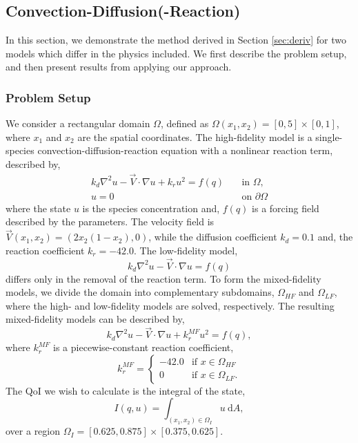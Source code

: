 \subsection{Convection-Diffusion(-Reaction)} \label{sec:cdvcdr}
%
In this section, we demonstrate the method derived in Section \ref{sec:deriv} for two models which differ in the physics included. We first describe the problem setup, and then present results from applying our approach.
%
\subsubsection{Problem Setup} \label{sec:cdvcdrSetup}
%
We consider a rectangular domain $\Omega$, defined as $\Omega(x_1,x_2)=[0,5]\times[0,1]$, where $x_1$ and $x_2$ are the spatial coordinates. The high-fidelity model is a single-species convection-diffusion-reaction equation with a nonlinear reaction term, described by,
%
\begin{subequations}
\label{eq:cdvcdrHF}
\begin{align}
k_d\nabla^2 u - \vec{V}\cdot\nabla u + k_ru^2 = f(q) \quad &\text{in } \Omega, \label{eq:cdvcdrHF_int} \\
u = 0 \quad &\text{on } \partial \Omega \label{eq:cdvcdrHF_bdry}
\end{align} 
\end{subequations}
%
where the state $u$ is the species concentration and, $f(q)$ is a forcing field described by the parameters. The velocity field is $\vec{V}(x_1,x_2) = (2x_2(1-x_2),0)$, while the diffusion coefficient $k_d = 0.1$ and, the reaction coefficient $k_r = -42.0$. The low-fidelity model,
%
\begin{equation}
k_d\nabla^2 u - \vec{V}\cdot\nabla u = f(q)
\end{equation}
%
differs only in the removal of the reaction term. To form the mixed-fidelity models, we divide the domain into complementary subdomains, $\Omega_{HF}$ and $\Omega_{LF}$, where the high- and low-fidelity models are solved, respectively. The resulting mixed-fidelity models can be described by, 
%
\begin{equation}
k_d\nabla^2 u - \vec{V}\cdot\nabla u + k^{MF}_ru^2= f(q),
\end{equation}
%
where $k^{MF}_r$ is a piecewise-constant reaction coefficient,
%
\begin{equation}
k^{MF}_r=
\begin{cases}
-42.0 & \textrm{if }x\in\Omega_{HF} \\
0 & \textrm{if }x\in\Omega_{LF}.
\end{cases}
\end{equation}
%
The QoI we wish to calculate is the integral of the state,
%
\begin{equation}
I(q,u)=\int_{(x_1,x_2)\in \Omega_I} u \:\textrm{d}A,
\end{equation}
%
over a region $\Omega_I=[0.625,0.875]\times[0.375,0.625]$. 

